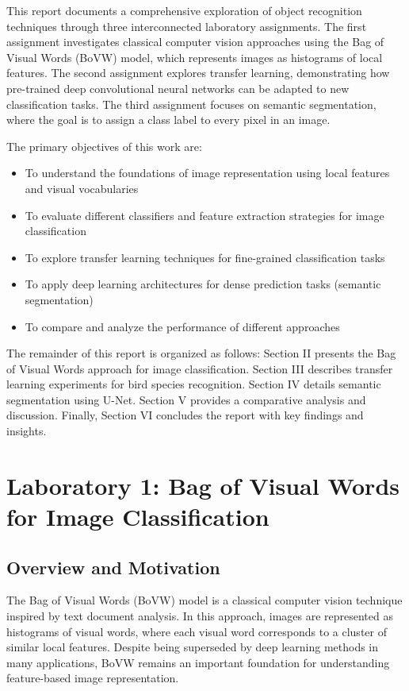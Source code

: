 \documentclass[conference]{IEEEtran}
\begin{document}
This report documents a comprehensive exploration of object recognition techniques through three interconnected laboratory assignments. The first assignment investigates classical computer vision approaches using the Bag of Visual Words (BoVW) model, which represents images as histograms of local features. The second assignment explores transfer learning, demonstrating how pre-trained deep convolutional neural networks can be adapted to new classification tasks. The third assignment focuses on semantic segmentation, where the goal is to assign a class label to every pixel in an image.

The primary objectives of this work are:
\begin{itemize}
\item To understand the foundations of image representation using local features and visual vocabularies
\item To evaluate different classifiers and feature extraction strategies for image classification
\item To explore transfer learning techniques for fine-grained classification tasks
\item To apply deep learning architectures for dense prediction tasks (semantic segmentation)
\item To compare and analyze the performance of different approaches
\end{itemize}

The remainder of this report is organized as follows: Section II presents the Bag of Visual Words approach for image classification. Section III describes transfer learning experiments for bird species recognition. Section IV details semantic segmentation using U-Net. Section V provides a comparative analysis and discussion. Finally, Section VI concludes the report with key findings and insights.

\section{Laboratory 1: Bag of Visual Words for Image Classification}

\subsection{Overview and Motivation}

The Bag of Visual Words (BoVW) model is a classical computer vision technique inspired by text document analysis. In this approach, images are represented as histograms of visual words, where each visual word corresponds to a cluster of similar local features. Despite being superseded by deep learning methods in many applications, BoVW remains an important foundation for understanding feature-based image representation.
\end{document}
